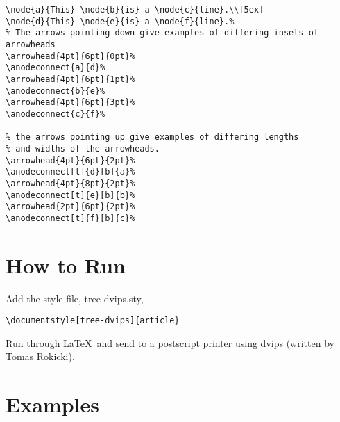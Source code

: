 \begin{verbatim}
\node{a}{This} \node{b}{is} a \node{c}{line}.\\[5ex]
\node{d}{This} \node{e}{is} a \node{f}{line}.%
% The arrows pointing down give examples of differing insets of arrowheads
\arrowhead{4pt}{6pt}{0pt}%
\anodeconnect{a}{d}%
\arrowhead{4pt}{6pt}{1pt}%
\anodeconnect{b}{e}%
\arrowhead{4pt}{6pt}{3pt}%
\anodeconnect{c}{f}%

% the arrows pointing up give examples of differing lengths 
% and widths of the arrowheads. 
\arrowhead{4pt}{6pt}{2pt}%
\anodeconnect[t]{d}[b]{a}%
\arrowhead{4pt}{8pt}{2pt}%
\anodeconnect[t]{e}[b]{b}%
\arrowhead{2pt}{6pt}{2pt}%
\anodeconnect[t]{f}[b]{c}%
\end{verbatim}

\section{How to Run}

Add the style file, tree-dvips.sty, 
\begin{verbatim}
\documentstyle[tree-dvips]{article}
\end{verbatim}
Run through \LaTeX\ and send to a postscript printer using dvips
(written by Tomas Rokicki).


\section{Examples}

